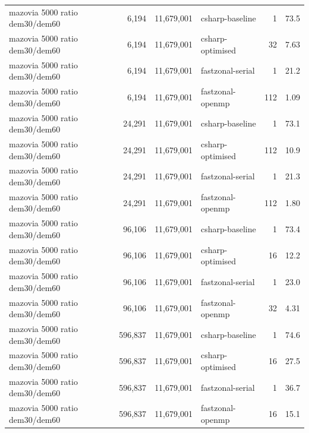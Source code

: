 \begin{tabular}{lrrlrr}
mazovia 5000 ratio dem30/dem60 & 6,194 & 11,679,001 & csharp-baseline & 1 & 73.5 \\
mazovia 5000 ratio dem30/dem60 & 6,194 & 11,679,001 & csharp-optimised & 32 & 7.63 \\
mazovia 5000 ratio dem30/dem60 & 6,194 & 11,679,001 & fastzonal-serial & 1 & 21.2 \\
mazovia 5000 ratio dem30/dem60 & 6,194 & 11,679,001 & fastzonal-openmp & 112 & 1.09 \\
mazovia 5000 ratio dem30/dem60 & 24,291 & 11,679,001 & csharp-baseline & 1 & 73.1 \\
mazovia 5000 ratio dem30/dem60 & 24,291 & 11,679,001 & csharp-optimised & 112 & 10.9 \\
mazovia 5000 ratio dem30/dem60 & 24,291 & 11,679,001 & fastzonal-serial & 1 & 21.3 \\
mazovia 5000 ratio dem30/dem60 & 24,291 & 11,679,001 & fastzonal-openmp & 112 & 1.80 \\
mazovia 5000 ratio dem30/dem60 & 96,106 & 11,679,001 & csharp-baseline & 1 & 73.4 \\
mazovia 5000 ratio dem30/dem60 & 96,106 & 11,679,001 & csharp-optimised & 16 & 12.2 \\
mazovia 5000 ratio dem30/dem60 & 96,106 & 11,679,001 & fastzonal-serial & 1 & 23.0 \\
mazovia 5000 ratio dem30/dem60 & 96,106 & 11,679,001 & fastzonal-openmp & 32 & 4.31 \\
mazovia 5000 ratio dem30/dem60 & 596,837 & 11,679,001 & csharp-baseline & 1 & 74.6 \\
mazovia 5000 ratio dem30/dem60 & 596,837 & 11,679,001 & csharp-optimised & 16 & 27.5 \\
mazovia 5000 ratio dem30/dem60 & 596,837 & 11,679,001 & fastzonal-serial & 1 & 36.7 \\
mazovia 5000 ratio dem30/dem60 & 596,837 & 11,679,001 & fastzonal-openmp & 16 & 15.1 \\
\bottomrule
\end{tabular}
